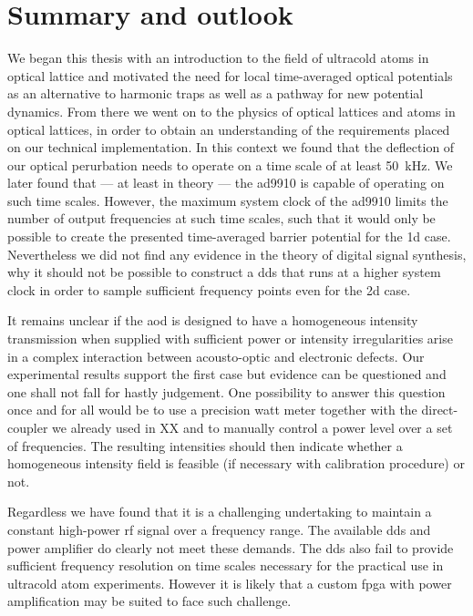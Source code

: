 \chapter{Summary and outlook}

We began this thesis with an introduction to the field of ultracold atoms
in optical lattice and motivated the need for local time-averaged optical
potentials as an alternative to harmonic traps as well as a pathway for new
potential dynamics. From there we went on to the physics of optical lattices
and atoms in optical lattices, in order to obtain an understanding of the
requirements placed on our technical implementation. In this context we found
that the deflection of our optical perurbation needs to operate on a time
scale of at least \SI{50}{\kilo\hertz}. We later found that --- at least in
theory --- the \gls{ad9910} is capable of operating on such time scales.
However, the maximum system clock of the \gls{ad9910} limits the number of
output frequencies at such time scales, such that it would only be possible
to create the presented time-averaged barrier potential for the \gls{1d} case.
Nevertheless we did not find any evidence in the theory of digital signal
synthesis, why it should not be possible to construct a \gls{dds} that runs at
a higher system clock in order to sample sufficient frequency points even for
the \gls{2d} case.

It remains unclear if the \gls{aod} is designed to have a homogeneous
intensity transmission when supplied with sufficient power or intensity
irregularities arise in a complex interaction between acousto-optic and
electronic defects. Our experimental results support the first case but
evidence can be questioned and one shall not fall for hastly judgement.
One possibility to answer this question once and for all would be to use a
precision watt meter together with the direct-coupler we already used in XX
and to manually control a power level over a set of frequencies. The
resulting intensities should then indicate whether a homogeneous intensity
field is feasible (if necessary with calibration procedure) or not.

Regardless we have found that it is a challenging undertaking to maintain a
constant high-power \gls{rf} signal over a frequency range. The available
\gls{dds} and power amplifier do clearly not meet these demands. The
\gls{dds} also fail to provide sufficient frequency resolution on time scales
necessary for the practical use in ultracold atom experiments. However it is
likely that a custom \gls{fpga} with power amplification may be suited to
face such challenge.

